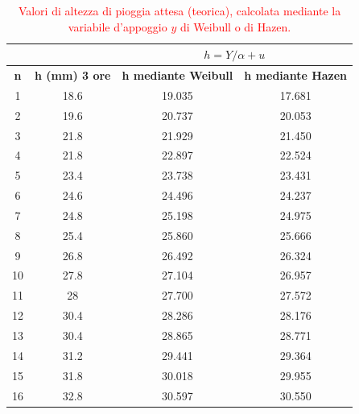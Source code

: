 \begin{table}[H] \centering
    \caption{\textcolor{red}{Valori di altezza di pioggia attesa (teorica), calcolata mediante la variabile d'appoggio $y$ di Weibull o di Hazen.}}
    \begin{tabular}{cccc}
 & & \multicolumn{2}{c}{$h = Y/\alpha + u$}       \\
 \toprule
    \textbf{n} & \textbf{h (mm)  3 ore} & \textbf{h mediante Weibull} & \textbf{h mediante Hazen} \\
\midrule
    1          & 18.6                      & 19.035                & 17.681                 \\
    2          & 19.6                      & 20.737                & 20.053                 \\
    3          & 21.8                      & 21.929                & 21.450                 \\
    4          & 21.8                      & 22.897                & 22.524                 \\
    5          & 23.4                      & 23.738                & 23.431                 \\
    6          & 24.6                      & 24.496                & 24.237                 \\
    7          & 24.8                      & 25.198                & 24.975                 \\
    8          & 25.4                      & 25.860                & 25.666                 \\
    9          & 26.8                      & 26.492                & 26.324                 \\
    10         & 27.8                      & 27.104                & 26.957                 \\
    11         & 28                        & 27.700                & 27.572                 \\
    12         & 30.4                      & 28.286                & 28.176                 \\
    13         & 30.4                      & 28.865                & 28.771                 \\
    14         & 31.2                      & 29.441                & 29.364                 \\
    15         & 31.8                      & 30.018                & 29.955                 \\
    16         & 32.8                      & 30.597                & 30.550                 \\

\end{tabular}
\end{table}
